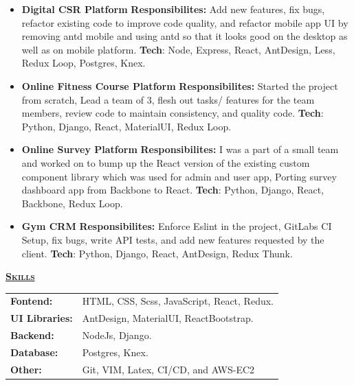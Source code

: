 \documentclass[11pt, a4paper]{article}
\begin{document}
\begin{flushleft}
\begin{itemize}
    \item {\bf{Digital CSR Platform}}
    \newline
    \textbf{Responsibilites:} Add new features, fix bugs, refactor existing code to improve code quality, and refactor mobile app UI by removing antd mobile and using antd so that it looks good on the desktop as well as on mobile platform.
    \newline
    \textbf{Tech}: Node, Express, React, AntDesign, Less, Redux Loop, Postgres, Knex. 

    \item \textbf{Online Fitness Course Platform}
    \newline
    \textbf{Responsibilites:} Started the project from scratch, Lead a team of 3, flesh out tasks/ features for the team members, review code to maintain consistency, and quality code.
    \newline
    \textbf{Tech}: Python, Django, React, MaterialUI, Redux Loop.

    \item \textbf{Online Survey Platform}
    \newline
    \textbf{Responsibilites:} I was a part of a small team and worked on to bump up the React version of the existing custom component library which was used for admin and user app, Porting survey dashboard app from Backbone to React.
    \newline
    \textbf{Tech}: Python, Django, React, Backbone, Redux Loop.

    \item \textbf{Gym CRM}
    \newline
    \textbf{Responsibilites:} Enforce Eslint in the project, GitLabs CI Setup, fix bugs, write API tests, and add new features requested by the client.
    \newline
    \textbf{Tech}: Python, Django, React, AntDesign, Redux Thunk.
    \newline
\end{itemize}

\end{flushleft}

\begin{flushleft}
    \uline{\textsc{\large{\textbf{Skills}}}\hfill}
    \newline
    \newline
    \begin{tabular}{l l}
        \textbf{Fontend: } & HTML, CSS, Scss, JavaScript, React, Redux.\\
        \textbf{UI Libraries: } & AntDesign, MaterialUI, ReactBootstrap.\\
        \textbf{Backend: } & NodeJs, Django.\\
        \textbf{Database: } & Postgres, Knex.\\
        \textbf{Other: } & Git, VIM, Latex, CI/CD, and AWS-EC2\\
    \end{tabular}
    \newline
\end{flushleft}
\end{document}
